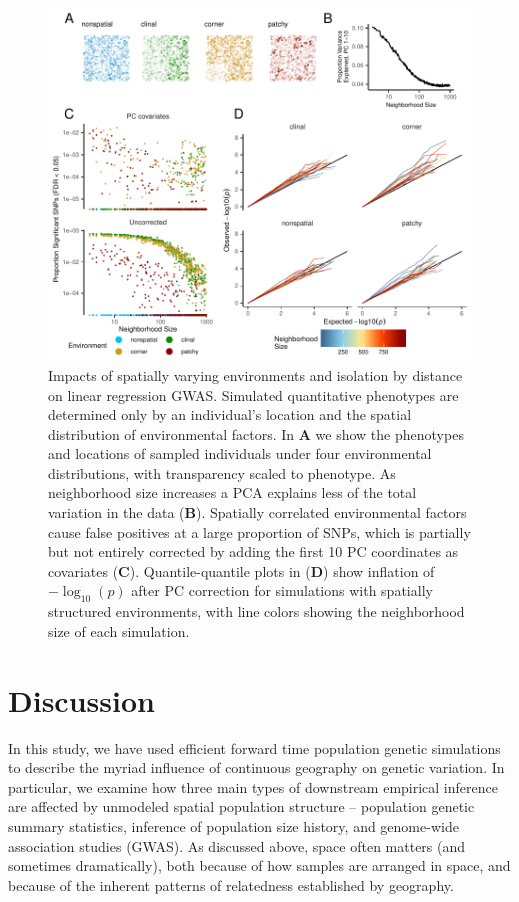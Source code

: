\documentclass[10pt,twoside,lineno,hidelinks]{preprint}
\begin{document}
\begin{figure}[p]
\centering
\includegraphics[width=\textwidth]{figures/gwas_summary_loglog_qqlines.pdf}
    \caption{Impacts of spatially varying environments and isolation by distance on linear regression GWAS. Simulated quantitative phenotypes are determined only by an individual's location and the spatial distribution of environmental factors. In \textbf{A} we show the phenotypes and locations of sampled individuals under four environmental distributions, with transparency scaled to phenotype. As neighborhood size increases a PCA explains less of the total variation in the data (\textbf{B}).
    Spatially correlated environmental factors cause false positives at a large proportion of SNPs, which is partially but not entirely corrected by adding the first 10 PC coordinates as covariates (\textbf{C}).
    Quantile-quantile plots in (\textbf{D}) show inflation of $-\log_{10}(p)$ after PC correction for simulations with spatially structured environments, with line colors showing the neighborhood size of each simulation.
}
\label{fig:gwas}
\end{figure}

\section{Discussion}

In this study,
we have used efficient forward time population genetic simulations 
to describe the myriad influence of continuous geography on genetic variation. 
In particular, we examine how three main types of downstream empirical inference are affected by unmodeled spatial population structure --
population genetic summary statistics, inference of population size history, and genome-wide association studies (GWAS). 
As discussed above, 
space often matters (and sometimes dramatically),
both because of how samples are arranged in space, and because of the inherent patterns of relatedness established by geography.
\end{document}
